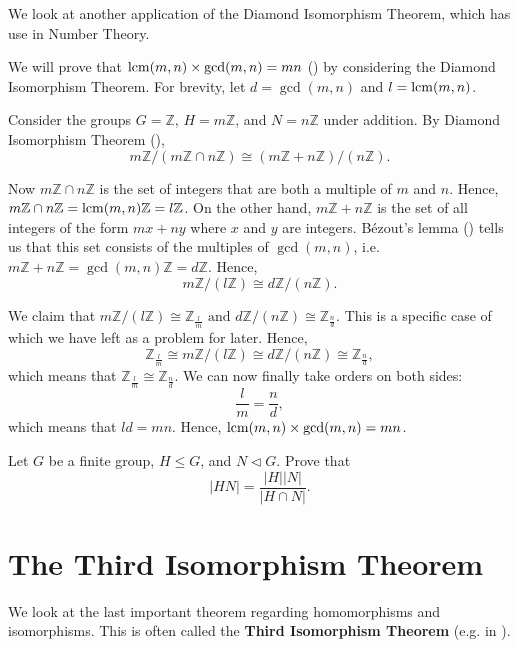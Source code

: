 We look at another application of the Diamond Isomorphism Theorem, which has use in Number Theory.
\begin{example}
    We will prove that $\mathrm{lcm}(m,n)\times\gcd(m,n) = mn$ () by considering the Diamond Isomorphism Theorem. For brevity, let $d = \gcd(m,n)$ and $l = \mathrm{lcm}(m,n)$.

    Consider the groups $G = \mathbb{Z}$, $H = m\mathbb{Z}$, and $N = n\mathbb{Z}$ under addition. By Diamond Isomorphism Theorem (),
    \[
        m\mathbb{Z}/(m\mathbb{Z} \cap n\mathbb{Z}) \cong (m\mathbb{Z} + n\mathbb{Z})/(n\mathbb{Z}).
    \]

    Now $m\mathbb{Z} \cap n\mathbb{Z}$ is the set of integers that are both a multiple of $m$ and $n$. Hence, $m\mathbb{Z} \cap n\mathbb{Z} = \mathrm{lcm}(m,n)\mathbb{Z} = l\mathbb{Z}$. On the other hand, $m\mathbb{Z} + n\mathbb{Z}$ is the set of all integers of the form $mx+ny$ where $x$ and $y$ are integers. B\'{e}zout's lemma () tells us that this set consists of the multiples of $\gcd(m,n)$, i.e. $m\mathbb{Z} + n\mathbb{Z} = \gcd(m,n)\mathbb{Z} = d\mathbb{Z}$. Hence,
    \[
        m\mathbb{Z}/(l\mathbb{Z}) \cong d\mathbb{Z}/(n\mathbb{Z}).
    \]

    We claim that $m\mathbb{Z} / (l\mathbb{Z}) \cong \mathbb{Z}_{\frac lm} \text{ and } d\mathbb{Z} / (n\mathbb{Z}) \cong \mathbb{Z}_{\frac nd}$. This is a specific case of  which we have left as a problem for later. Hence,
    \[
    \mathbb{Z}_{\frac lm} \cong m\mathbb{Z}/(l\mathbb{Z}) \cong d\mathbb{Z}/(n\mathbb{Z}) \cong \mathbb{Z}_{\frac nd},
    \]
    which means that $\mathbb{Z}_{\frac lm} \cong \mathbb{Z}_{\frac nd}$. We can now finally take orders on both sides:
    \[
        \frac{l}{m} = \frac{n}{d},
    \]
    which means that $ld = mn$. Hence, $\mathrm{lcm}(m,n)\times\gcd(m,n) = mn$.
\end{example}

\begin{exercise}\label{exercise-order-of-subgroup-product}
    Let $G$ be a finite group, $H \leq G$, and $N \lhd G$. Prove that
    \[
        |HN| = \frac{|H||N|}{|H \cap N|}.
    \]
\end{exercise}

\section{The Third Isomorphism Theorem}
We look at the last important theorem regarding homomorphisms and isomorphisms. This is often called the \textbf{Third Isomorphism Theorem} (e.g. in \cite{cohn_1982, hungerford_1980}).

